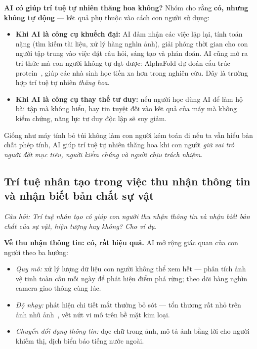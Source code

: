\textbf{AI có giúp trí tuệ tự nhiên thăng hoa không?} Nhóm cho rằng \textbf{có, nhưng không tự động} — kết quả phụ thuộc vào cách con người sử dụng:
\begin{itemize}
    \item \textbf{Khi AI là công cụ khuếch đại:} AI đảm nhận các việc lặp lại, tính toán nặng (tìm kiếm tài liệu, xử lý hàng nghìn ảnh), giải phóng thời gian cho con người tập trung vào việc đặt câu hỏi, sáng tạo và phán đoán. AI cũng mở ra tri thức mà con người không tự đạt được: AlphaFold dự đoán cấu trúc protein~\citep{week2_alphafold2021}, giúp các nhà sinh học tiến xa hơn trong nghiên cứu. Đây là trường hợp trí tuệ tự nhiên \emph{thăng hoa}.
    \item \textbf{Khi AI là công cụ thay thế tư duy:} nếu người học dùng AI để làm hộ bài tập mà không hiểu, hay tin tuyệt đối vào kết quả của máy mà không kiểm chứng, năng lực tư duy độc lập sẽ suy giảm.
\end{itemize}
Giống như máy tính bỏ túi không làm con người kém toán đi nếu ta vẫn hiểu bản chất phép tính, AI giúp trí tuệ tự nhiên thăng hoa khi con người \emph{giữ vai trò người đặt mục tiêu, người kiểm chứng và người chịu trách nhiệm}.

\subsection{Trí tuệ nhân tạo trong việc thu nhận thông tin và nhận biết bản chất sự vật}
\label{subsec:w2_ai_essence}

\textit{Câu hỏi: Trí tuệ nhân tạo có giúp con người thu nhận thông tin và nhận biết bản chất của sự vật, hiện tượng hay không? Cho ví dụ.}

\textbf{Về thu nhận thông tin: có, rất hiệu quả.} AI mở rộng giác quan của con người theo ba hướng:
\begin{itemize}
    \item \emph{Quy mô:} xử lý lượng dữ liệu con người không thể xem hết — phân tích ảnh vệ tinh toàn cầu mỗi ngày để phát hiện điểm phá rừng; theo dõi hàng nghìn camera giao thông cùng lúc.
    \item \emph{Độ nhạy:} phát hiện chi tiết mắt thường bỏ sót — tổn thương rất nhỏ trên ảnh nhũ ảnh~\citep{mckinney2020international}, vết nứt vi mô trên bề mặt kim loại.
    \item \emph{Chuyển đổi dạng thông tin:} đọc chữ trong ảnh, mô tả ảnh bằng lời cho người khiếm thị, dịch biển báo tiếng nước ngoài.
\end{itemize}

